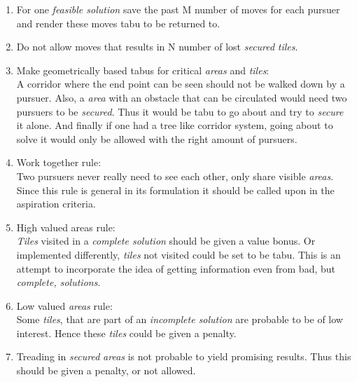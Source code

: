 \begin{enumerate}
\item{}For one \emph{feasible solution} save the past M number of moves for each pursuer and render these moves tabu to be returned to.
\item{}Do not allow moves that results in N number of lost \emph{secured} \emph{tiles}.
\item{}Make geometrically based tabus for critical \emph{areas} and \emph{tiles}:\vspace{0,1cm}\\
A corridor where the end point can be seen should not be walked down by a pursuer. Also, a \emph{area} with an obstacle that can be circulated would need two pursuers to be \emph{secured}. Thus it would be tabu to go about and try to \emph{secure} it alone. And finally if one had a tree like corridor system, going about to solve it would only be allowed with the right amount of pursuers.
\item{} Work together rule: \vspace{0,1cm}\\
Two pursuers never really need to see each other, only share visible \emph{areas}. Since this rule is general in its formulation it should be called upon in the aspiration criteria.
\item{} High valued areas rule: \vspace{0,1cm}\\
\emph{Tiles} visited in a \emph{complete solution} should be given a value bonus. Or implemented differently, \emph{tiles} not visited could be set to be tabu. This is an attempt to incorporate the idea of getting information even from bad, but \emph{complete, solutions}.
\item{} Low valued \emph{areas} rule: \vspace{0,1cm}\\
Some \emph{tiles}, that are part of an \emph{incomplete solution} are probable to be of low interest. Hence these \emph{tiles} could be given a penalty.
\item{} Treading in \emph{secured} \emph{areas} is not probable to yield promising results. Thus this should be given a penalty, or not allowed.
\end{enumerate}

